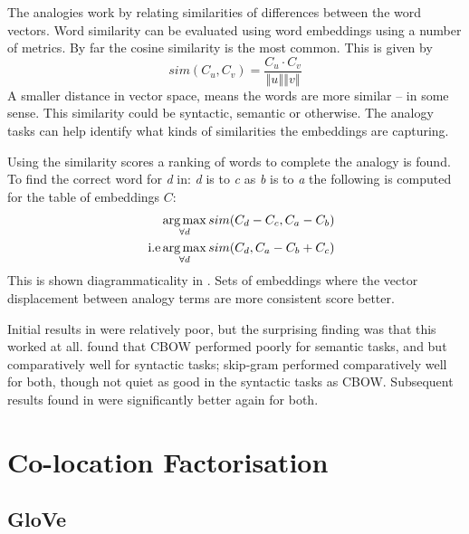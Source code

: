 \documentclass[parskip]{komatufte}
\begin{document}
The analogies work by relating similarities of differences between the word vectors.
Word similarity can be evaluated using word embeddings using a number of metrics.
By far the cosine similarity is the most common.
This is given by 
\begin{equation}
sim(C_u, C_v)=\frac{C_{u}\cdot C_{v}}{\left\Vert u\right\Vert \left\Vert v\right\Vert }
\end{equation}
A smaller distance in vector space, means the words are more similar -- in some sense.
This similarity could be syntactic, semantic or otherwise.
The analogy tasks can help identify what kinds of similarities the embeddings are capturing.

Using the similarity scores a ranking of words to complete the analogy is found.
To find the correct word for \emph{d} in: \emph{d} is to \emph{c} as \emph{b} is to \emph{a}
the following is computed for the table of embeddings $C$:
\begin{align}
\qquad & \operatorname*{arg\,max}_{\forall d} sim(C_d - C_c, C_a-C_b)\\
\text{i.e} & \operatorname*{arg\,max}_{\forall d} sim(C_d, C_a-C_b+C_c)
\end{align}
This is shown diagrammaticality in .
Sets of embeddings where the vector displacement between analogy terms are more consistent score better.


Initial results in \textcite{mikolov2013linguisticsubstructures} were relatively poor, but the surprising finding was that this worked at all.
\textcite{mikolov2013efficient} found that CBOW performed poorly for semantic tasks, and but comparatively well for syntactic tasks; skip-gram performed comparatively well for both, though not quiet as good in the syntactic tasks as CBOW.
Subsequent results found in   were significantly better again for both.


\section{Co-location Factorisation}

\subsection{GloVe}
\end{document}

